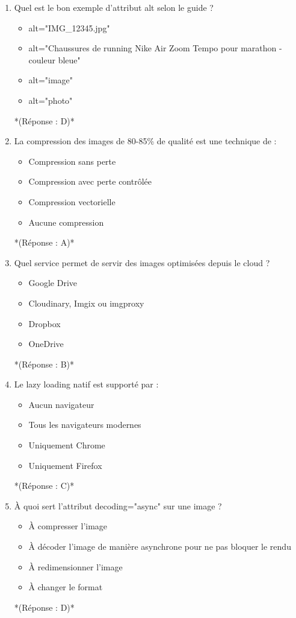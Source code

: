 \documentclass[12pt,a4paper,twoside]{report}
\begin{document}
\begin{enumerate}
\item Quel est le bon exemple d'attribut alt selon le guide ?
\begin{itemize}
\item[A)] alt="IMG\_12345.jpg"
\item[B)] alt="Chaussures de running Nike Air Zoom Tempo pour marathon - couleur bleue"
\item[C)] alt="image"
\item[D)] alt="photo"
\end{itemize}
*(Réponse : D)*

\item La compression des images de 80-85\% de qualité est une technique de :
\begin{itemize}
\item[A)] Compression sans perte
\item[B)] Compression avec perte contrôlée
\item[C)] Compression vectorielle
\item[D)] Aucune compression
\end{itemize}
*(Réponse : A)*

\item Quel service permet de servir des images optimisées depuis le cloud ?
\begin{itemize}
\item[A)] Google Drive
\item[B)] Cloudinary, Imgix ou imgproxy
\item[C)] Dropbox
\item[D)] OneDrive
\end{itemize}
*(Réponse : B)*

\item Le lazy loading natif est supporté par :
\begin{itemize}
\item[A)] Aucun navigateur
\item[B)] Tous les navigateurs modernes
\item[C)] Uniquement Chrome
\item[D)] Uniquement Firefox
\end{itemize}
*(Réponse : C)*

\item À quoi sert l'attribut decoding="async" sur une image ?
\begin{itemize}
\item[A)] À compresser l'image
\item[B)] À décoder l'image de manière asynchrone pour ne pas bloquer le rendu
\item[C)] À redimensionner l'image
\item[D)] À changer le format
\end{itemize}
*(Réponse : D)*


\end{enumerate}
\end{document}
